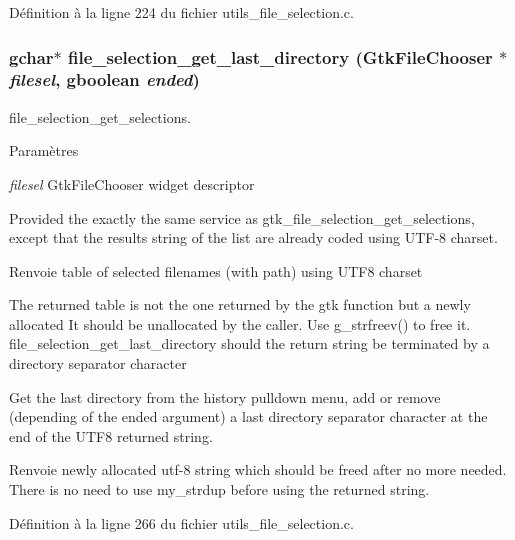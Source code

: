 Définition à la ligne 224 du fichier utils\_\-file\_\-selection.c.

\subsubsection[{file\_\-selection\_\-get\_\-last\_\-directory}]{\setlength{\rightskip}{0pt plus 5cm}gchar$\ast$ file\_\-selection\_\-get\_\-last\_\-directory (GtkFileChooser $\ast$ {\em filesel}, \/  gboolean {\em ended})}\label{utils__file__selection_8c_a7ceee035264e3ea82cd7e5863650a6c3}
file\_\-selection\_\-get\_\-selections.


\begin{DoxyParams}{Paramètres}
\item[{\em filesel}]GtkFileChooser widget descriptor\end{DoxyParams}
Provided the exactly the same service as gtk\_\-file\_\-selection\_\-get\_\-selections, except that the results string of the list are already coded using UTF-\/8 charset.

\begin{DoxyReturn}{Renvoie}
table of selected filenames (with path) using UTF8 charset
\end{DoxyReturn}
The returned table is not the one returned by the gtk function but a newly allocated It should be unallocated by the caller. Use g\_\-strfreev() to free it. file\_\-selection\_\-get\_\-last\_\-directory   should the return string be terminated by a directory separator character

Get the last directory from the history pulldown menu, add or remove (depending of the ended argument) a last directory separator character at the end of the UTF8 returned string.

\begin{DoxyReturn}{Renvoie}
newly allocated utf-\/8 string which should be freed after no more needed. There is no need to use my\_\-strdup before using the returned string. 
\end{DoxyReturn}


Définition à la ligne 266 du fichier utils\_\-file\_\-selection.c.

